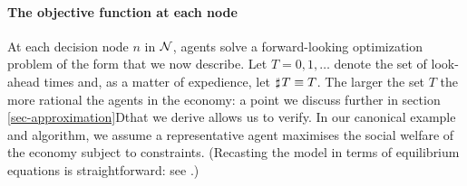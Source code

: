 \documentclass[12pt,a4paper,twoside, draft]{article}
\newcommand{\countof}{\mathbin{\sharp}\hskip1pt}
\begin{document}
\paragraph{The objective function at each node}
At each decision node $n$ in $\mathcal N$, agents solve a forward-looking
optimization problem of the form that we now describe.
Let $T = 0, 1, \dots$ denote the set of look-ahead times and, as a matter of
expedience, let $\countof T \equiv T$.
The larger the set $T$ the more rational the agents in the economy: a point we
discuss further in section \ref{sec-approximation}Dthat we derive allows us to verify.
In our canonical example and algorithm, we assume
a representative agent maximises the social welfare of the economy subject to
constraints.
(Recasting the model in terms of equilibrium equations is straightforward:
see \citet[Algorithm 2]{CJ}.)
\end{document}
